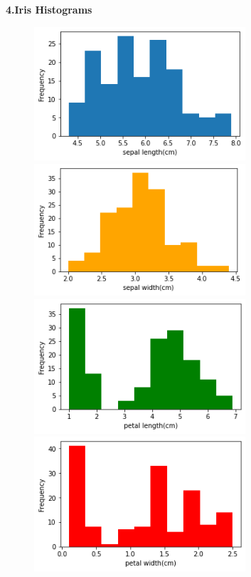 \documentclass{article}
\begin{document}
\Huge\textbf{4.Iris Histograms}
\vspace{3cm}
\Large
\begin{figure}[h]
\centering
    \includegraphics[width=0.7\textwidth]{4.1.png}\\
    \includegraphics[width=0.7\textwidth]{4.2.png}\\
    \includegraphics[width=0.7\textwidth]{4.3.png}\\
    \includegraphics[width=0.7\textwidth]{4.4.png}\\
    
\end{figure}
\end{document}
